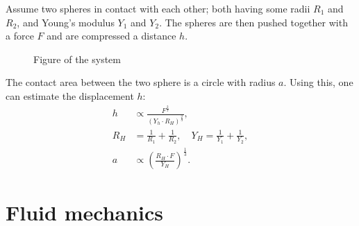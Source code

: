 \documentclass[a4paper]{article}
\begin{document}
\vspace{0.5cm}\noindent
Assume two spheres in contact with each other; both having some radii $R_1$ and $R_2$, and Young's modulus $Y_1$ and $Y_2$. The spheres are then pushed together with a force $F$ and are compressed a distance $h$.
\begin{figure}[H]
    \centering
    \caption{Figure of the system}
    \label{fig: hertzian spheres}
\end{figure}\noindent The contact area between the two sphere is a circle with radius $a$. Using this, one can estimate the displacement $h$:
\begin{align*}
    h&\propto \frac{F^{\frac{2}{3}}}{\left(Y_h\cdot R_H\right)^{\frac{2}{3}}},\\
    R_H &= \frac{1}{R_1} + \frac{1}{R_2}, \quad Y_H = \frac{1}{Y_1} + \frac{1}{Y_2},\\
    a&\propto \left(\frac{R_H\cdot F}{Y_H}\right)^{\frac{1}{3}}.
\end{align*}







\section{Fluid mechanics}\label{sec: Fluid mechanics}
\end{document}
